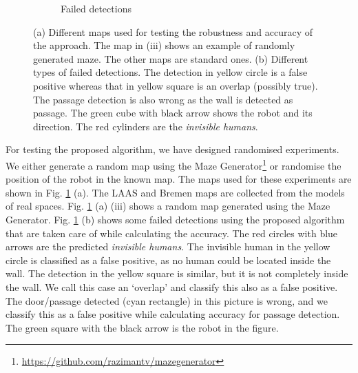 \begin{figure}[h!]
\begin{subfigure}[t]{0.45\columnwidth}
  \caption{Failed detections}
\end{subfigure}
\caption{(a) Different maps used for testing the robustness and accuracy of the approach. The map in (iii) shows an example of randomly generated maze. The other maps are standard ones. (b) Different types of failed detections. The detection in yellow circle is a false positive whereas that in yellow square is an overlap (possibly true). The passage detection is also wrong as the wall is detected as passage. The green cube with black arrow shows the robot and its direction. The red cylinders are the \textit{invisible humans}.}
\label{fig:random_exps}
\end{figure}

\noindent For testing the proposed algorithm, we have designed randomised experiments. We either generate a random map using the Maze Generator\footnote{\url{https://github.com/razimantv/mazegenerator}} or randomise the position of the robot in the known map. The maps used for these experiments are shown in Fig. \ref{fig:random_exps} (a). The LAAS and Bremen maps are collected from the models of real spaces. Fig. \ref{fig:random_exps} (a) (iii) shows a random map generated using the Maze Generator. Fig. \ref{fig:random_exps} (b) shows some failed detections using the proposed algorithm that are taken care of while calculating the accuracy. The red circles with blue arrows are the predicted \textit{invisible humans}. The invisible human in the yellow circle is classified as a false positive, as no human could be located inside the wall. The detection in the yellow square is similar, but it is not completely inside the wall. We call this case an `overlap' and classify this also as a false positive. The door/passage detected (cyan rectangle) in this picture is wrong, and we classify this as a false positive while calculating accuracy for passage detection. The green square with the black arrow is the robot in the figure.

